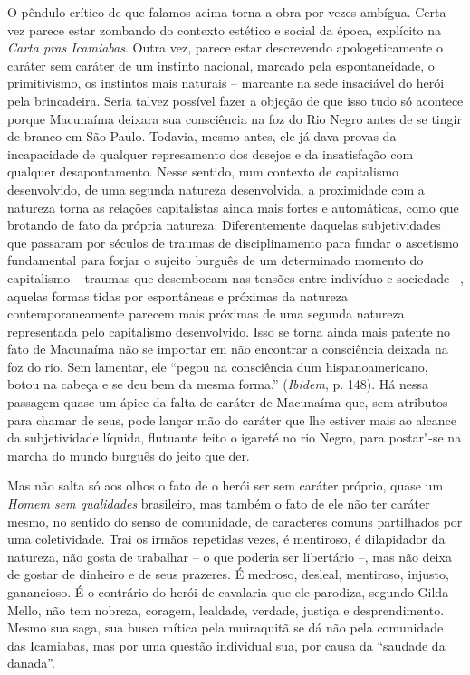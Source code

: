 O pêndulo crítico de que falamos acima torna a obra por vezes ambígua.
Certa vez parece estar zombando do contexto estético e social da época,
explícito na \emph{Carta pras Icamiabas}. Outra vez, parece estar
descrevendo apologeticamente o caráter sem caráter de um instinto
nacional, marcado pela espontaneidade, o primitivismo, os instintos mais
naturais -- marcante na sede insaciável do herói pela brincadeira. Seria
talvez possível fazer a objeção de que isso tudo só acontece porque
Macunaíma deixara sua consciência na foz do Rio Negro antes de se tingir
de branco em São Paulo. Todavia, mesmo antes, ele já dava provas da
incapacidade de qualquer represamento dos desejos e da insatisfação com
qualquer desapontamento. Nesse sentido, num contexto de capitalismo
desenvolvido, de uma segunda natureza desenvolvida, a proximidade com a
natureza torna as relações capitalistas ainda mais fortes e automáticas,
como que brotando de fato da própria natureza. Diferentemente daquelas
subjetividades que passaram por séculos de traumas de disciplinamento
para fundar o ascetismo fundamental para forjar o sujeito burguês de um
determinado momento do capitalismo -- traumas que desembocam nas tensões
entre indivíduo e sociedade --, aquelas formas tidas por espontâneas e
próximas da natureza contemporaneamente parecem mais próximas de uma
segunda natureza representada pelo capitalismo desenvolvido. Isso se
torna ainda mais patente no fato de Macunaíma não se importar em não
encontrar a consciência deixada na foz do rio. Sem lamentar, ele ``pegou
na consciência dum hispanoamericano, botou na cabeça e se deu bem da
mesma forma.'' (\emph{Ibidem}, p. 148). Há nessa passagem quase um ápice
da falta de caráter de Macunaíma que, sem atributos para chamar de seus,
pode lançar mão do caráter que lhe estiver mais ao alcance da
subjetividade líquida, flutuante feito o igareté no rio Negro, para
postar"-se na marcha do mundo burguês do jeito que der.

Mas não salta só aos olhos o fato de o herói ser sem caráter próprio,
quase um \emph{Homem sem qualidades} brasileiro, mas também o fato de
ele não ter caráter mesmo, no sentido do senso de comunidade, de
caracteres comuns partilhados por uma coletividade. Trai os irmãos
repetidas vezes, é mentiroso, é dilapidador da natureza, não gosta de
trabalhar -- o que poderia ser libertário --, mas não deixa de gostar de
dinheiro e de seus prazeres. É medroso, desleal, mentiroso, injusto,
ganancioso. É o contrário do herói de cavalaria que ele parodiza,
segundo Gilda Mello, não tem nobreza, coragem, lealdade, verdade,
justiça e desprendimento. Mesmo sua saga, sua busca mítica pela
muiraquitã se dá não pela comunidade das Icamiabas, mas por uma questão
individual sua, por causa da ``saudade da danada''.

